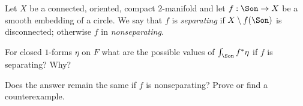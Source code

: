 Let $X$ be a connected, oriented, compact $2$-manifold and let
$f:\Son\rightarrow X$ be a smooth embedding of a circle. We say that
$f$ is \emph{separating} if $X\setminus f(\Son)$ is disconnected;
otherwise $f$ in \emph{nonseparating}.
\begin{alist}
\item For closed $1$-forms $\eta$ on $F$ what are the possible values of 
$\int_{\Son} f^*\eta$ if $f$ is separating? Why?
\item Does the answer remain the same if $f$ is nonseparating? Prove
or find a counterexample.
\end{alist}
